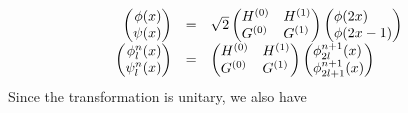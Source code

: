 \documentclass[letterpaper]{article}
\begin{document}
\begin{equation}
\begin{matrix}\hfill \left(\begin{matrix}\hfill \phi (x)\\\hfill \psi
(x)\end{matrix}\right)&\text{=}&\sqrt{2}\left(\begin{matrix}H^{(0)}\hfill\null &H^{(1)}\hfill\null \\G^{(0)}\hfill\null
&G^{(1)}\hfill\null \end{matrix}\right)\left(\begin{matrix}\phi (2x)\hfill\null \\\phi (2x-1)\hfill\null
\end{matrix}\right)\hfill\null \\\hfill \left(\begin{matrix}\hfill \phi _{l}^{n}(x)\\\hfill \psi
_{l}^{n}(x)\end{matrix}\right)&\text{=}&\left(\begin{matrix}H^{(0)}\hfill\null &H^{(1)}\hfill\null \\G^{(0)}\hfill\null
&G^{(1)}\hfill\null \end{matrix}\right)\left(\begin{matrix}\phi _{2l}^{n+1}(x)\hfill\null \\\phi
_{2l+1}^{n+1}(x)\hfill\null \end{matrix}\right)\hfill\null \end{matrix}
\end{equation}
Since the transformation is unitary, we also have
\end{document}
